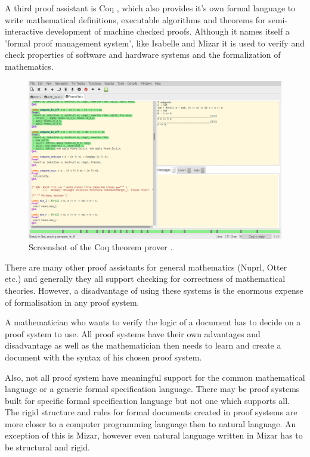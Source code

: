 A third proof assistant is Coq \cite{coq}, which also provides it's own formal
language to write mathematical definitions, executable algorithms and theorems
for semi-interactive development of machine checked proofs. Although it names
itself a 'formal proof management system', like Isabelle and Mizar it is used to
verify and check properties of software and hardware systems and the
formalization of mathematics.

\begin{figure}[H]
\begin{center}
\includegraphics[scale=0.4]{Figures/Background/coq.png}
\end{center}
\caption{Screenshot of the Coq theorem prover \cite{coq}. \label{fig:coq}}
\end{figure}

There are many other proof assistants for general mathematics (Nuprl, Otter
etc.) and generally they all support checking for correctness of mathematical
theories. However, a disadvantage of using these systems is the enormous expense
of formalisation in any proof system. 

A mathematician who wants to verify the logic of a document has to decide on a
proof system to use. All proof systems have their own advantages and
disadvantage as well as the mathematician then needs to learn and create a
document with the syntax of his chosen proof system.

Also, not all proof system have meaningful support for the common mathematical
language or a generic formal specification language. There may be proof systems
built for specific formal specification language but not one which supports all.
The rigid structure and rules for formal documents created in proof systems are
more closer to a computer programming language then to natural language. An
exception of this is Mizar, however even natural language written in Mizar has
to be structural and rigid.

